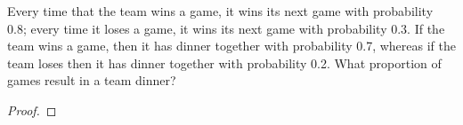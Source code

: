 \begin{problem}{4.28}
  Every time that the team wins a game, it wins its next game with probability 0.8;
  every time it loses a game, it wins its next game with probability 0.3. If the
  team wins a game, then it has dinner together with probability 0.7, whereas
  if the team loses then it has dinner together with probability 0.2. What
  proportion of games result in a team dinner?
\end{problem}

\begin{proof}
\end{proof}
\newpage
